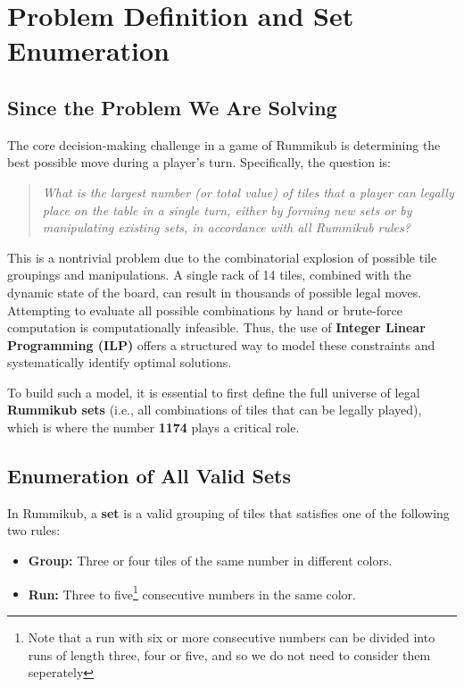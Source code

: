 \documentclass[11pt,letterpaper]{article}
\begin{document}
\section*{Problem Definition and Set Enumeration}

\subsection*{Since the Problem We Are Solving}

The core decision-making challenge in a game of Rummikub is determining the best possible move during a player's turn. Specifically, the question is:

\begin{quote}
    \emph{What is the largest number (or total value) of tiles that a player can legally place on the table in a single turn, either by forming new sets or by manipulating existing sets, in accordance with all Rummikub rules?}
\end{quote}

This is a nontrivial problem due to the combinatorial explosion of possible tile groupings and manipulations. A single rack of 14 tiles, combined with the dynamic state of the board, can result in thousands of possible legal moves. Attempting to evaluate all possible combinations by hand or brute-force computation is computationally infeasible. Thus, the use of \textbf{Integer Linear Programming (ILP)} offers a structured way to model these constraints and systematically identify optimal solutions.

To build such a model, it is essential to first define the full universe of legal \textbf{Rummikub sets} (i.e., all combinations of tiles that can be legally played), which is where the number \textbf{1174} plays a critical role.

\subsection*{Enumeration of All Valid Sets}

In Rummikub, a \textbf{set} is a valid grouping of tiles that satisfies one of the following two rules:
\begin{itemize}
    \item \textbf{Group:} Three or four tiles of the same number in different colors.
    \item \textbf{Run:} Three to five\footnote{Note that a run with six or more 
    consecutive numbers can be divided into runs of length three, four or five, and
     so we do not need to consider them seperately} consecutive numbers in the same color.
\end{itemize}
\end{document}
